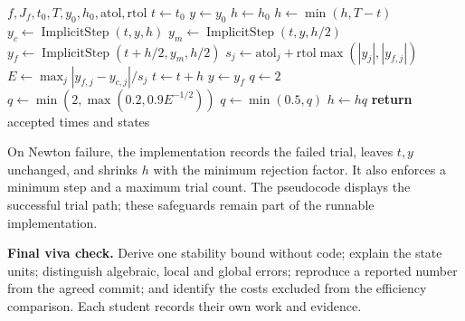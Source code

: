 \documentclass[11pt]{article}
\begin{document}
\newpage
\begin{algorithm}[H]
\caption{Adaptive implicit Euler; accept two half steps, $p=1$}
\begin{algorithmic}[1]
\REQUIRE $f,J_f,t_0,T,y_0,h_0,\mathrm{atol},\mathrm{rtol}$
\STATE $t\leftarrow t_0$
\STATE $y\leftarrow y_0$
\STATE $h\leftarrow h_0$
\STATE $h\leftarrow\min(h,T-t)$
\STATE $y_c\leftarrow\operatorname{ImplicitStep}(t,y,h)$
\STATE $y_m\leftarrow\operatorname{ImplicitStep}(t,y,h/2)$
\STATE $y_f\leftarrow\operatorname{ImplicitStep}(t+h/2,y_m,h/2)$
\STATE $s_j\leftarrow\mathrm{atol}_j+\mathrm{rtol}\max(|y_j|,|y_{f,j}|)$
\STATE $E\leftarrow\max_j|y_{f,j}-y_{c,j}|/s_j$
\STATE $t\leftarrow t+h$
\STATE $y\leftarrow y_f$
\ENDIF
{}
\STATE $q\leftarrow2$
\ELSE
\STATE $q\leftarrow\min(2,\max(0.2,0.9E^{-1/2}))$
\ENDIF
{}
\STATE $q\leftarrow\min(0.5,q)$
\ENDIF
\STATE $h\leftarrow hq$
\ENDWHILE
\STATE \textbf{return} accepted times and states
\end{algorithmic}
\end{algorithm}
On Newton failure, the implementation records the failed trial, leaves $t,y$
unchanged, and shrinks $h$ with the minimum rejection factor. It also enforces
a minimum step and a maximum trial count. The pseudocode displays the successful
trial path; these safeguards remain part of the runnable implementation.

\textbf{Final viva check.} Derive one stability bound without code; explain the
state units; distinguish algebraic, local and global errors; reproduce a reported
number from the agreed commit; and identify the costs excluded from the efficiency
comparison. Each student records their own work and evidence.
\end{document}
